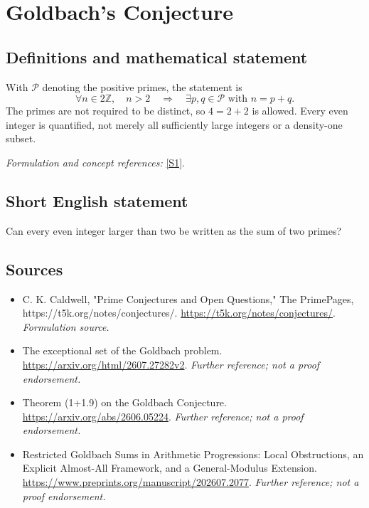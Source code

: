 \documentclass[11pt]{article}
\begin{document}
\section*{\texorpdfstring{Goldbach's Conjecture}{Goldbach's Conjecture}}\label{statement}
\subsection{Definitions and mathematical statement}
With $\mathcal P$ denoting the positive primes, the statement is
\[
 \forall n\in2{\mathbb{Z}},\quad n>2\quad\Longrightarrow\quad
 \exists p,q\in\mathcal P\text{ with }n=p+q.
\]
The primes are not required to be distinct, so $4=2+2$ is allowed. Every even integer is quantified, not merely all sufficiently large integers or a density-one subset.
\par\smallskip\textit{Formulation and concept references:} \href{https://t5k.org/notes/conjectures/}{[S1]}.

\subsection{Short English statement}
Can every even integer larger than two be written as the sum of two primes?
\subsection{Sources}
\begin{itemize}
\item[S1]C. K. Caldwell, "Prime Conjectures and Open Questions," The PrimePages, https://t5k.org/notes/conjectures/.
\url{https://t5k.org/notes/conjectures/}.
\textit{Formulation source.}
\item[S2]The exceptional set of the Goldbach problem.
\url{https://arxiv.org/html/2607.27282v2}.
\textit{Further reference; not a proof endorsement.}
\item[S3]Theorem (1+1.9) on the Goldbach Conjecture.
\url{https://arxiv.org/abs/2606.05224}.
\textit{Further reference; not a proof endorsement.}
\item[S4]Restricted Goldbach Sums in Arithmetic Progressions: Local Obstructions, an Explicit Almost-All Framework, and a General-Modulus Extension.
\url{https://www.preprints.org/manuscript/202607.2077}.
\textit{Further reference; not a proof endorsement.}
\end{itemize}
\end{document}
